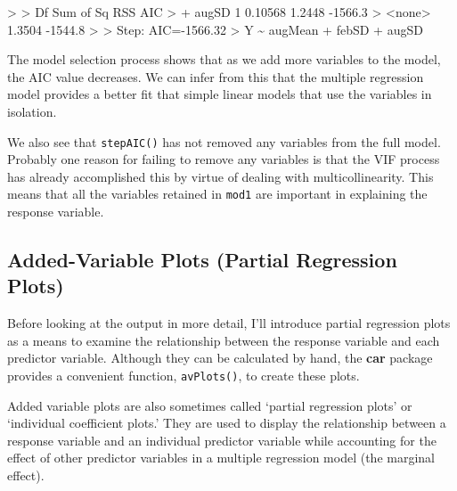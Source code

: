 \documentclass[
  letterpaper,
]{book}
\newenvironment{Shaded}{\begin{snugshade}}{\end{snugshade}}
\newcommand{\DecValTok}[1]{\textcolor[rgb]{0.68,0.00,0.00}{#1}}
\newcommand{\ErrorTok}[1]{\textcolor[rgb]{0.68,0.00,0.00}{#1}}
\newcommand{\FloatTok}[1]{\textcolor[rgb]{0.68,0.00,0.00}{#1}}
\newcommand{\NormalTok}[1]{\textcolor[rgb]{0.00,0.23,0.31}{#1}}
\newcommand{\OtherTok}[1]{\textcolor[rgb]{0.00,0.23,0.31}{#1}}
\newcommand{\SpecialCharTok}[1]{\textcolor[rgb]{0.37,0.37,0.37}{#1}}
\begin{document}
\begin{Shaded}
\begin{Highlighting}[]
\SpecialCharTok{\textgreater{}} 
\ErrorTok{\textgreater{}}\NormalTok{         Df Sum of Sq    RSS     AIC}
\SpecialCharTok{\textgreater{}} \SpecialCharTok{+}\NormalTok{ augSD  }\DecValTok{1}   \FloatTok{0.10568} \FloatTok{1.2448} \SpecialCharTok{{-}}\FloatTok{1566.3}
\SpecialCharTok{\textgreater{}} \ErrorTok{\textless{}}\NormalTok{none}\SpecialCharTok{\textgreater{}}               \FloatTok{1.3504} \SpecialCharTok{{-}}\FloatTok{1544.8}
\SpecialCharTok{\textgreater{}} 
\ErrorTok{\textgreater{}}\NormalTok{ Step}\SpecialCharTok{:}\NormalTok{  AIC}\OtherTok{=}\SpecialCharTok{{-}}\FloatTok{1566.32}
\SpecialCharTok{\textgreater{}}\NormalTok{ Y }\SpecialCharTok{\textasciitilde{}}\NormalTok{ augMean }\SpecialCharTok{+}\NormalTok{ febSD }\SpecialCharTok{+}\NormalTok{ augSD}
\end{Highlighting}
\end{Shaded}

The model selection process shows that as we add more variables to the
model, the AIC value decreases. We can infer from this that the multiple
regression model provides a better fit that simple linear models that
use the variables in isolation.

We also see that \texttt{stepAIC()} has not removed any variables from
the full model. Probably one reason for failing to remove any variables
is that the VIF process has already accomplished this by virtue of
dealing with multicollinearity. This means that all the variables
retained in \texttt{mod1} are important in explaining the response
variable.

\subsection{Added-Variable Plots (Partial Regression
Plots)}\label{sec-added-variable-plots}

Before looking at the output in more detail, I'll introduce partial
regression plots as a means to examine the relationship between the
response variable and each predictor variable. Although they can be
calculated by hand, the \textbf{car} package provides a convenient
function, \texttt{avPlots()}, to create these plots.

Added variable plots are also sometimes called `partial regression
plots' or `individual coefficient plots.' They are used to display the
relationship between a response variable and an individual predictor
variable while accounting for the effect of other predictor variables in
a multiple regression model (the marginal effect).
\end{document}
